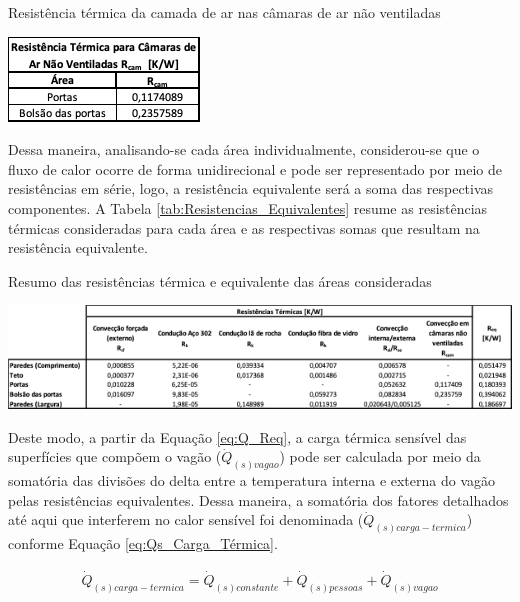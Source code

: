 \documentclass[acronym,symbols,table]{fei}
\begin{document}
\begin{table}[!htb] 
 \centering
    \caption{Resistência térmica da camada de ar nas câmaras de ar não ventiladas}
    \includegraphics[width=0.4\linewidth]{Tabelas/Resistencia_Camaras.png}
    \label{tab:Resistencia_Camaras}
\end{table}

Dessa maneira, analisando-se cada área individualmente, considerou-se que o fluxo de calor ocorre de forma unidirecional e pode ser representado por meio de resistências em série, logo, a resistência equivalente será a soma das respectivas componentes. A Tabela \ref{tab:Resistencias_Equivalentes} resume as resistências térmicas consideradas para cada área e as respectivas somas que resultam na resistência equivalente.

\begin{table}[!htb] 
 \centering
    \caption{Resumo das resistências térmica e equivalente das áreas consideradas}
    \includegraphics[width=1.0\linewidth]{Tabelas/Resistencias_Equivalentes.png}
    \label{tab:Resistencias_Equivalentes}
\end{table}

Deste modo, a partir da Equação \ref{eq:Q_Req}, a carga térmica sensível das superfícies que compõem o vagão ($\dot{Q}_{(s)vagao}$) pode ser calculada por meio da somatória das divisões do delta entre a temperatura interna e externa do vagão pelas resistências equivalentes. Dessa maneira, a somatória dos fatores detalhados até aqui que interferem no calor sensível foi denominada ($\dot{Q}_{(s)carga-termica}$) conforme Equação \ref{eq:Qs_Carga_Térmica}.

\begin{equation} \label{eq:Qs_Carga_Térmica}
    \begin{aligned}
      \dot{Q}_{(s)carga-termica}=\dot{Q}_{(s)constante} + \dot{Q}_{(s)pessoas} + \dot{Q}_{(s)vagao}
    \end{aligned}
\end{equation}
\end{document}
